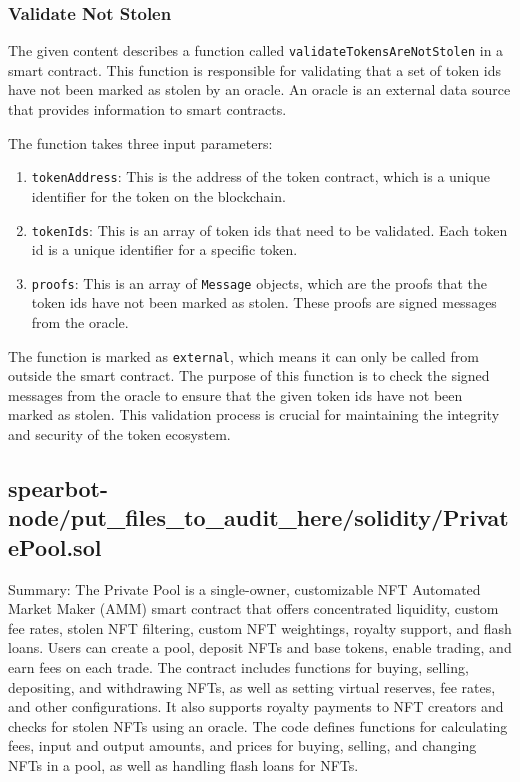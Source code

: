 \hypertarget{validate-not-stolen}{%
\subsubsection{Validate Not Stolen}\label{validate-not-stolen}}

The given content describes a function called
\texttt{validateTokensAreNotStolen} in a smart contract. This function
is responsible for validating that a set of token ids have not been
marked as stolen by an oracle. An oracle is an external data source that
provides information to smart contracts.

The function takes three input parameters:

\begin{enumerate}
\def\labelenumi{\arabic{enumi}.}
\tightlist
\item
  \texttt{tokenAddress}: This is the address of the token contract,
  which is a unique identifier for the token on the blockchain.
\item
  \texttt{tokenIds}: This is an array of token ids that need to be
  validated. Each token id is a unique identifier for a specific token.
\item
  \texttt{proofs}: This is an array of \texttt{Message} objects, which
  are the proofs that the token ids have not been marked as stolen.
  These proofs are signed messages from the oracle.
\end{enumerate}

The function is marked as \texttt{external}, which means it can only be
called from outside the smart contract. The purpose of this function is
to check the signed messages from the oracle to ensure that the given
token ids have not been marked as stolen. This validation process is
crucial for maintaining the integrity and security of the token
ecosystem.

\hypertarget{spearbot-nodeput_files_to_audit_heresolidityprivatepoolsol}{%
\subsection{spearbot-node/put\_files\_to\_audit\_here/solidity/PrivatePool.sol}\label{spearbot-nodeput_files_to_audit_heresolidityprivatepoolsol}}

Summary: The Private Pool is a single-owner, customizable NFT Automated
Market Maker (AMM) smart contract that offers concentrated liquidity,
custom fee rates, stolen NFT filtering, custom NFT weightings, royalty
support, and flash loans. Users can create a pool, deposit NFTs and base
tokens, enable trading, and earn fees on each trade. The contract
includes functions for buying, selling, depositing, and withdrawing
NFTs, as well as setting virtual reserves, fee rates, and other
configurations. It also supports royalty payments to NFT creators and
checks for stolen NFTs using an oracle. The code defines functions for
calculating fees, input and output amounts, and prices for buying,
selling, and changing NFTs in a pool, as well as handling flash loans
for NFTs.

